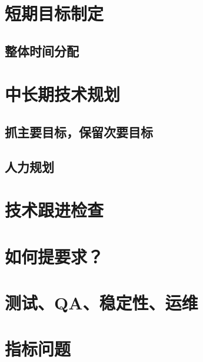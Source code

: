 
\section{短期目标制定} %
\subsection{整体时间分配}

\section{中长期技术规划}
\subsection{抓主要目标，保留次要目标}
\subsection{人力规划}

\section{技术跟进检查}

\section{如何提要求？}

\section{测试、QA、稳定性、运维}

\section{指标问题}
